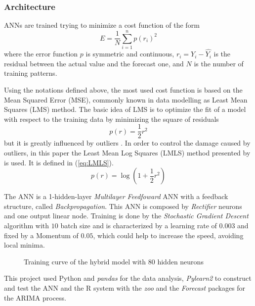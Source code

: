 \documentclass{sig-alternate-sigmod07}
\begin{document}
\subsubsection{Architecture}

ANNs are trained trying to minimize a cost function of the form
\begin{displaymath}E= \frac{1}{N}\sum_{i=1}^np(r_i)^2\end{displaymath}
where the error function $p$ is symmetric and continuous, $r_i = Y_i - \hat{Y_i}$ is the residual between the actual value and the forecast one, and $N$ is the number of training patterns.

Using the notations defined above, the most used cost function is based on the Mean Squared Error (MSE), commonly known in data modelling as Least Mean Squares (LMS) method. The basic idea of LMS is to optimize the fit of a model with respect to the training data by minimizing the square of residuals
\begin{displaymath}p(r)= \frac{1}{2}r^2\end{displaymath}
but it is greatly influenced by outliers \cite{liano1996robust}. In order to control the damage caused by outliers, in this paper the Least Mean Log Squares (LMLS) method presented by \cite{liano1996robust} is used. It is defined in (\cref{eq:LMLS}).
\begin{equation}
p(r) = \log(1 + \frac{1}{2}r^2)
\label{eq:LMLS}
\end{equation}

The ANN is a 1-hidden-layer \emph{Multilayer Feedfoward} ANN with a feedback structure, called \textit{Backpropagation}. This ANN is composed by \emph{Rectifier} neurons and one output linear node. Training is done by the \emph{Stochastic Gradient Descent} algorithm with $10$ batch size and is characterized by a learning rate of $0.003$ and fixed by a Momentum of $0.05$, which could help to increase the speed, avoiding local minima.

\begin{figure}
\centering
{}
\caption{Training curve of the hybrid model with 80 hidden neurons}
\end{figure}

This project used Python and \emph{pandas} for the data analysis, \emph{Pylearn2} \cite{goodfellow2013pylearn2} to construct and test the ANN and the R system with the \emph{zoo} \cite{zeileis2005zoo} and the \emph{Forecast} \cite{hyndman2007automatic} packages for the ARIMA process. 
\end{document}
